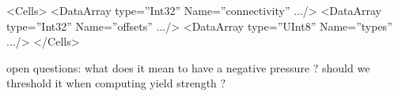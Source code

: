  <Cells>
      <DataArray type=”Int32” Name=”connectivity” .../>
      <DataArray type=”Int32” Name=”offsets” .../>
      <DataArray type=”UInt8” Name=”types” .../>
    </Cells>


open questions:
what does it mean to have a negative pressure ? should we threshold it when computing yield strength ? 
